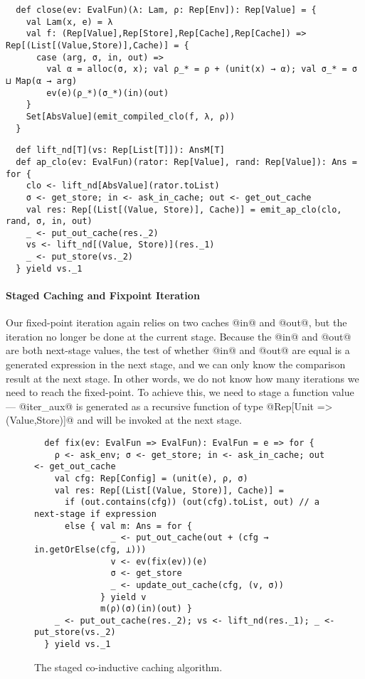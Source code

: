 \begin{lstlisting}
  def close(ev: EvalFun)(λ: Lam, ρ: Rep[Env]): Rep[Value] = {
    val Lam(x, e) = λ
    val f: (Rep[Value],Rep[Store],Rep[Cache],Rep[Cache]) => Rep[(List[(Value,Store)],Cache)] = {
      case (arg, σ, in, out) =>
        val α = alloc(σ, x); val ρ_* = ρ + (unit(x) → α); val σ_* = σ ⊔ Map(α → arg)
        ev(e)(ρ_*)(σ_*)(in)(out)
    }
    Set[AbsValue](emit_compiled_clo(f, λ, ρ))
  }
\end{lstlisting}

\begin{lstlisting}
  def lift_nd[T](vs: Rep[List[T]]): AnsM[T]
  def ap_clo(ev: EvalFun)(rator: Rep[Value], rand: Rep[Value]): Ans = for {
    clo <- lift_nd[AbsValue](rator.toList)
    σ <- get_store; in <- ask_in_cache; out <- get_out_cache
    val res: Rep[(List[(Value, Store)], Cache)] = emit_ap_clo(clo, rand, σ, in, out)
    _ <- put_out_cache(res._2)
    vs <- lift_nd[(Value, Store)](res._1)
    _ <- put_store(vs._2)
  } yield vs._1
\end{lstlisting}

\paragraph{Staged Caching and Fixpoint Iteration} 

Our fixed-point iteration again relies on two caches @in@ and @out@, but the
iteration no longer be done at the current stage. Because the @in@ and @out@ are
both next-stage values, the test of whether @in@ and @out@ are equal is a
generated expression in the next stage, and we can only know the comparison
result at the next stage. In other words, we do not know how many iterations we
need to reach the fixed-point. To achieve this, we need to stage a function
value --- @iter_aux@ is generated as a recursive function of type @Rep[Unit => (Value,Store)]@ 
and will be invoked at the next stage.

\begin{figure}[t!]
  \centering
\begin{lstlisting}
  def fix(ev: EvalFun => EvalFun): EvalFun = e => for {
    ρ <- ask_env; σ <- get_store; in <- ask_in_cache; out <- get_out_cache
    val cfg: Rep[Config] = (unit(e), ρ, σ)
    val res: Rep[(List[(Value, Store)], Cache)] =
      if (out.contains(cfg)) (out(cfg).toList, out) // a next-stage if expression
      else { val m: Ans = for {
               _ <- put_out_cache(out + (cfg → in.getOrElse(cfg, ⊥)))
               v <- ev(fix(ev))(e)
               σ <- get_store
               _ <- update_out_cache(cfg, (v, σ))
             } yield v
             m(ρ)(σ)(in)(out) }
    _ <- put_out_cache(res._2); vs <- lift_nd(res._1); _ <- put_store(vs._2)
  } yield vs._1
\end{lstlisting}
\vspace{-1em}
\caption{The staged co-inductive caching algorithm.}
\label{fig:staged_coind_cache}
\end{figure}

